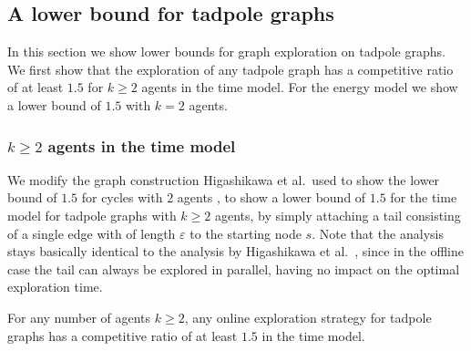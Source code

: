 \subsection{A lower bound for tadpole graphs}\label{lower_bound_tad}

In this section we show lower bounds for graph exploration on tadpole graphs. We first show that the exploration of any tadpole graph has a competitive ratio of at least
$1.5$ for $k\geq 2$ agents in the time model. For the energy model we show a lower bound of $1.5$ with $k=2$ agents. 
\subsubsection*{$k\geq2$ agents in the time model} We modify the graph construction Higashikawa et al.\ used to show the lower bound of $1.5$ for cycles with $2$ agents \cite{Higashikawa2012},
to show a lower bound of $1.5$ for the time model for tadpole graphs with $k \geq 2$ agents, by simply attaching a tail consisting of a single edge with of length $\varepsilon$ to the starting node $s$.
Note that the analysis stays basically identical to the analysis by Higashikawa et al.\ \cite{Higashikawa2012}, since in the offline case the tail can always be explored in parallel, having no impact on the
optimal exploration time.

\begin{theorem}\label{TadpoleTimeLower}
    For any number of agents $k \geq 2$, any online exploration strategy for tadpole graphs has a competitive ratio of at least $1.5$ in the time model.
\end{theorem}

